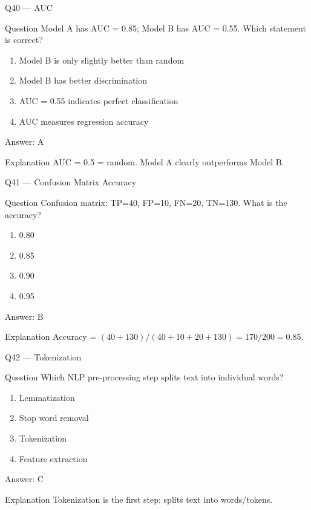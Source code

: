 \documentclass[aspectratio=169,8pt]{beamer}
\begin{document}
	\begin{frame}{Q40 --- AUC}
		\begin{block}{Question}
			Model A has AUC = 0.85; Model B has AUC = 0.55. Which statement is correct?
		\end{block}
		\begin{enumerate}
			\item Model B is only slightly better than random
			\item Model B has better discrimination
			\item AUC = 0.55 indicates perfect classification
			\item AUC measures regression accuracy
		\end{enumerate}
		\begin{exampleblock}{Answer: A}\end{exampleblock}
		\begin{block}{Explanation}
			AUC = 0.5 = random. Model A clearly outperforms Model B.
		\end{block}
	\end{frame}
	
	\begin{frame}{Q41 --- Confusion Matrix Accuracy}
		\begin{block}{Question}
			Confusion matrix: TP=40, FP=10, FN=20, TN=130. What is the accuracy?
		\end{block}
		\begin{enumerate}
			\item 0.80
			\item 0.85
			\item 0.90
			\item 0.95
		\end{enumerate}
		\begin{exampleblock}{Answer: B}\end{exampleblock}
		\begin{block}{Explanation}
			Accuracy = $(40+130)/(40+10+20+130) = 170/200 = 0.85$.
		\end{block}
	\end{frame}
	
	\begin{frame}{Q42 --- Tokenization}
		\begin{block}{Question}
			Which NLP pre-processing step splits text into individual words?
		\end{block}
		\begin{enumerate}
			\item Lemmatization
			\item Stop word removal
			\item Tokenization
			\item Feature extraction
		\end{enumerate}
		\begin{exampleblock}{Answer: C}\end{exampleblock}
		\begin{block}{Explanation}
			Tokenization is the first step: splits text into words/tokens.
		\end{block}
	\end{frame}
	
\end{document}
